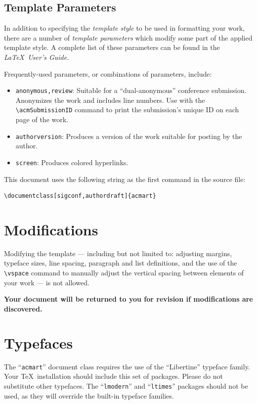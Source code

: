 \documentclass[manuscript,screen,review]{acmart}
\begin{document}
\subsection{Template Parameters}

In addition to specifying the {\itshape template style} to be used in
formatting your work, there are a number of {\itshape template parameters}
which modify some part of the applied template style. A complete list
of these parameters can be found in the {\itshape \LaTeX\ User's Guide.}

Frequently-used parameters, or combinations of parameters, include:
\begin{itemize}
\item {\verb|anonymous,review|}: Suitable for a ``dual-anonymous''
  conference submission. Anonymizes the work and includes line
  numbers. Use with the \verb|\acmSubmissionID| command to print the
  submission's unique ID on each page of the work.
\item{\verb|authorversion|}: Produces a version of the work suitable
  for posting by the author.
\item{\verb|screen|}: Produces colored hyperlinks.
\end{itemize}

This document uses the following string as the first command in the
source file:
\begin{verbatim}
\documentclass[sigconf,authordraft]{acmart}
\end{verbatim}

\section{Modifications}

Modifying the template --- including but not limited to: adjusting
margins, typeface sizes, line spacing, paragraph and list definitions,
and the use of the \verb|\vspace| command to manually adjust the
vertical spacing between elements of your work --- is not allowed.

{\bfseries Your document will be returned to you for revision if
  modifications are discovered.}

\section{Typefaces}

The ``\verb|acmart|'' document class requires the use of the
``Libertine'' typeface family. Your \TeX\ installation should include
this set of packages. Please do not substitute other typefaces. The
``\verb|lmodern|'' and ``\verb|ltimes|'' packages should not be used,
as they will override the built-in typeface families.
\end{document}
